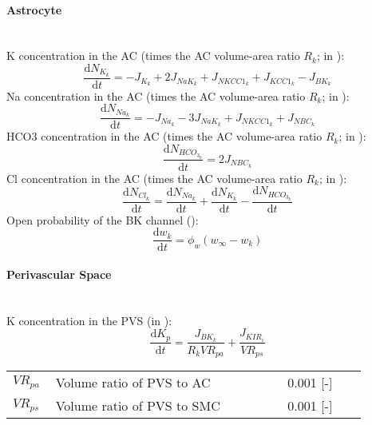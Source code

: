 \paragraph{Astrocyte}~\\
%
\gls{K} concentration in the AC  (times the AC volume-area ratio $R_k$; in \uMm):
\begin{equation} \label{eq:KInt}
\dfrac{\mathrm{d}N_{K_k}}{\mathrm{d}t}=- J_{K_k} + 2 J_{NaK_{k}} + J_{NKCC1_{k}} +  J_{KCC1_{k}}
- J_{BK_k}  
\end{equation}
%
\gls{Na} concentration in the AC  (times the AC volume-area ratio $R_k$; in \uMm):
\begin{equation} \label{eq:NaInt}
\dfrac{\mathrm{d}N_{Na_k}}{\mathrm{d}t}=-J_{Na_k} - 3 J_{NaK_{k}} + J_{NKCC1_{k}} +  J_{NBC_{k}}
\end{equation}
%
\gls{HCO3} concentration in the AC  (times the AC volume-area ratio $R_k$; in \uMm):
\begin{equation} \label{eq:HCOInt}
\dfrac{\mathrm{d}N_{HCO_{3_k}}}{\mathrm{d}t}= 2 J_{NBC_{k}} 
\end{equation}
%
\gls{Cl} concentration in the AC  (times the AC volume-area ratio $R_k$; in \uMm):
\begin{equation} \label{eq:ClInt}
\dfrac{\mathrm{d}N_{Cl_k}}{\mathrm{d}t}= \dfrac{\mathrm{d}N_{Na_k}}{\mathrm{d}t} + \dfrac{\mathrm{d}N_{K_k}}{\mathrm{d}t} - \dfrac{\mathrm{d}N_{HCO_{3_{k}}}}{\mathrm{d}t}
\end{equation}
%
Open probability of the BK channel (\pers):
\begin{equation} \label{eq:dwkdt}
\frac{\mathrm{d}w_{k}}{\mathrm{d}t} = \phi_{w} \left(w_{\infty}-w_{k} \right) 
\end{equation}
%
\paragraph{Perivascular Space}~\\
\gls{K} concentration in the PVS  (in \uM):
\begin{equation} \label{eq:K_p}
\dfrac{\mathrm{d}K_{p}}{\mathrm{d}t}= \frac{J_{BK_k}}{R_k VR_{pa}} + \frac{J_{KIR_i}}{ VR_{ps}}
\end{equation}
%
\begin{table}[h!]
\centering
\begin{tabular}{| p{0.09\linewidth} | >{\footnotesize} p{0.6\linewidth} | >{\footnotesize} p{0.17\linewidth} | >{\footnotesize} p{0.02\linewidth} |}
\arrayrulecolor{lightgrey}\hline
$ VR_{pa} $  & Volume ratio of PVS to AC & 0.001 [-] & \cite{LoesEvert} \\
$ VR_{ps} $  & Volume ratio of PVS to SMC & 0.001 [-] & \cite{LoesEvert} \\
\hline
\end{tabular}
\end{table}

